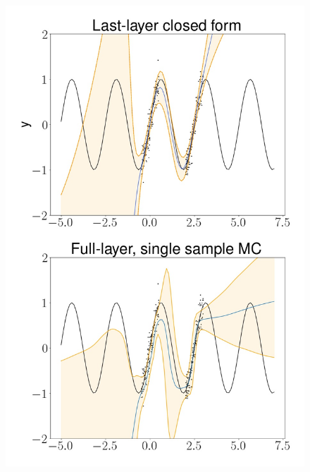 \documentclass{beamer}
\begin{document}
\begin{frame}
\begin{columns}
\begin{column}{0.4\textwidth}
\begin{figure}
                        \includegraphics[height=0.8\textheight]{images/Regression/LLvsFull.jpg}
                    \end{figure}
                \end{column}
            \end{columns}
        \end{frame}
\end{document}
